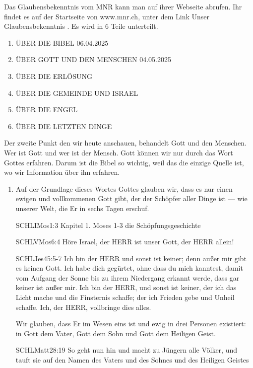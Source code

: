 \documentclass{../../inc/mybib}
\begin{document}
\begin{spacing}{1.5}
Das Glaubensbekenntnis vom MNR kann man auf ihrer Webseite abrufen. Ihr findet es auf der Startseite von www.mnr.ch, unter dem Link \frqq Unser Glaubensbekenntnis \flqq{}. Es wird in 6 Teile unterteilt.
\begin{enumerate}
    \item \uppercase{über die bibel} 06.04.2025
    \item \uppercase{über gott und den Menschen} 04.05.2025
    \item \uppercase{über die Erlösung}
    \item \uppercase{über die Gemeinde und Israel}
    \item \uppercase{über die Engel}
    \item \uppercase{über die letzten Dinge}
\end{enumerate}
Der zweite Punkt den wir heute anschauen, behandelt Gott und den Menschen. Wer ist Gott und wer ist der Mensch. Gott können wir nur durch das Wort Gottes erfahren. Darum ist die Bibel so wichtig, weil das die einzige Quelle ist, wo wir Information über ihn erfahren. 
\begin{enumerate}
    \item {} Auf der Grundlage dieses Wortes Gottes glauben wir, dass es nur einen ewigen und vollkommenen Gott gibt, der der Schöpfer aller Dinge ist — wie unserer Welt, die Er in sechs Tagen erschuf. 
    \begin{bibelbox}{SCHL}{IMos}{1:3}
        Kapitel 1. Moses 1-3 die Schöpfungsgeschichte
    \end{bibelbox}
    \begin{bibelbox}{SCHL}{VMos}{6:4}
        Höre Israel, der HERR ist unser Gott, der HERR allein!
    \end{bibelbox}
    \begin{bibelbox}{SCHL}{Jes}{45:5-7}
        Ich bin der HERR und sonst ist keiner; denn außer mir gibt es keinen Gott. Ich habe dich gegürtet, ohne dass du mich kanntest, damit vom Aufgang der Sonne bis zu ihrem Niedergang erkannt werde, dass gar keiner ist außer mir. Ich bin der HERR, und sonst ist keiner, der ich das Licht mache und die Finsternis schaffe; der ich Frieden gebe und Unheil schaffe. Ich, der HERR, vollbringe dies alles.
    \end{bibelbox}
    Wir glauben, dass Er im Wesen eins ist und ewig in drei Personen existiert: in Gott dem Vater, Gott dem Sohn und Gott dem Heiligen Geist.
    \begin{bibelbox}{SCHL}{Matt}{28:19}
        So geht nun hin und macht zu Jüngern alle Völker, und tauft sie auf den Namen des Vaters und des Sohnes und des Heiligen Geistes

\end{bibelbox}
\end{enumerate}
\end{spacing}
\end{document}
